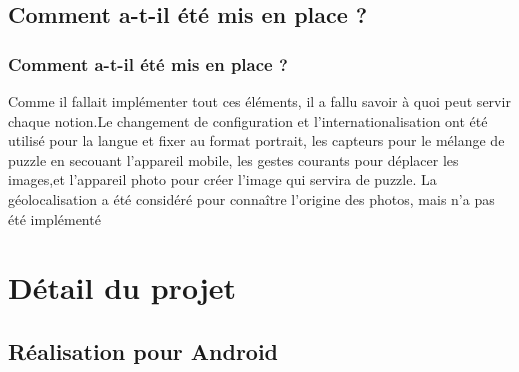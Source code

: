 \documentclass{beamer}
\begin{document}
\subsection{Comment a-t-il été mis en place ?}
\begin{frame}
\frametitle{Comment a-t-il été mis en place ?}
Comme il fallait implémenter tout ces éléments, il a fallu savoir à quoi peut servir chaque notion.Le changement de configuration et l'internationalisation ont été utilisé pour la langue et fixer au format portrait, les capteurs pour le mélange de puzzle en secouant l'appareil mobile, les gestes courants pour déplacer les images,et l'appareil photo pour créer l'image qui servira de puzzle. La géolocalisation a été considéré pour connaître l'origine des photos, mais n'a pas été implémenté
\end{frame}

\section{Détail du projet}
\subsection{Réalisation pour Android}
\end{document}

